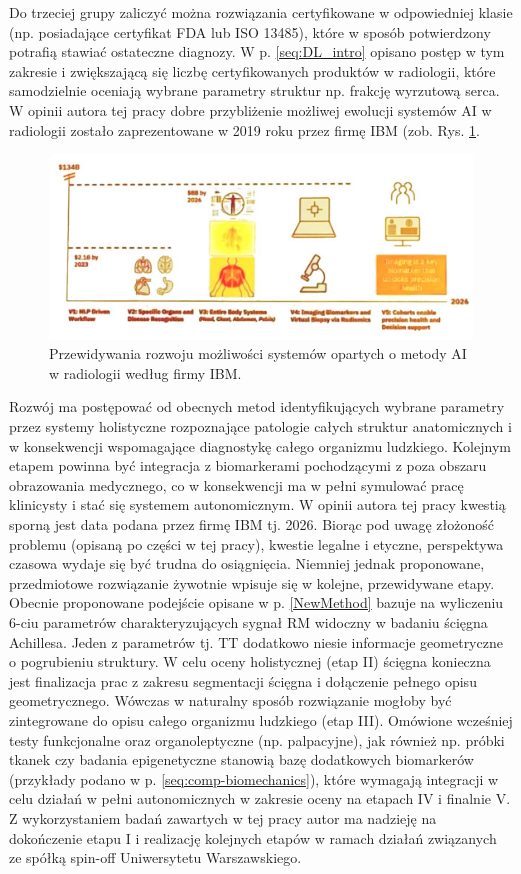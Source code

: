 Do trzeciej grupy zaliczyć można rozwiązania certyfikowane w odpowiedniej klasie (np. posiadające certyfikat FDA lub ISO 13485), które w sposób potwierdzony potrafią stawiać ostateczne diagnozy. W p. \ref{seq:DL_intro} opisano postęp w tym zakresie i zwiększającą się liczbę certyfikowanych produktów w radiologii, które samodzielnie oceniają wybrane parametry struktur np. frakcję wyrzutową serca. W opinii autora tej pracy dobre przybliżenie możliwej ewolucji systemów AI w radiologii zostało zaprezentowane w 2019 roku przez firmę IBM (zob. Rys. \ref{fig:IBM_pred}. 
\begin{figure}[h!]
	\includegraphics[width=\textwidth]{figures/Pred_AI.jpg}
	\caption{Przewidywania rozwoju możliwości systemów opartych o metody AI w radiologii według firmy IBM.}
	\label{fig:IBM_pred}
\end{figure}
Rozwój ma postępować od obecnych metod identyfikujących wybrane parametry przez systemy holistyczne rozpoznające patologie całych struktur anatomicznych i w konsekwencji wspomagające diagnostykę całego organizmu ludzkiego. Kolejnym etapem powinna być integracja z biomarkerami pochodzącymi z poza obszaru obrazowania medycznego, co w konsekwencji ma w pełni symulować pracę klinicysty i stać się systemem autonomicznym. W opinii autora tej pracy kwestią sporną jest data podana przez firmę IBM tj. 2026. Biorąc pod uwagę złożoność problemu (opisaną po części w tej pracy), kwestie legalne i etyczne, perspektywa czasowa wydaje się być trudna do osiągnięcia. Niemniej jednak proponowane, przedmiotowe rozwiązanie żywotnie wpisuje się w kolejne, przewidywane etapy. Obecnie proponowane podejście opisane w p. \ref{NewMethod} bazuje na wyliczeniu 6-ciu parametrów charakteryzujących sygnał RM widoczny w badaniu ścięgna Achillesa. Jeden z parametrów tj. TT dodatkowo niesie informacje geometryczne o pogrubieniu struktury. W celu oceny holistycznej (etap II) ścięgna konieczna jest finalizacja prac z zakresu segmentacji ścięgna i dołączenie pełnego opisu geometrycznego. Wówczas w naturalny sposób rozwiązanie mogłoby być zintegrowane do opisu całego organizmu ludzkiego (etap III). Omówione wcześniej testy funkcjonalne oraz organoleptyczne (np. palpacyjne), jak również np. próbki tkanek czy badania epigenetyczne stanowią bazę dodatkowych biomarkerów (przykłady podano w p. \ref{seq:comp-biomechanics}), które wymagają integracji w celu działań w pełni autonomicznych w zakresie oceny na etapach IV i finalnie V. Z wykorzystaniem badań zawartych w tej pracy autor ma nadzieję na dokończenie etapu I i realizację kolejnych etapów w ramach działań związanych ze spółką spin-off Uniwersytetu Warszawskiego. 

